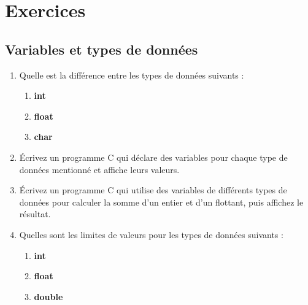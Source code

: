 \section{Exercices}

\subsection{Variables et types de données}
\begin{enumerate}
	\item Quelle est la différence entre les types de données suivants :
	\begin{enumerate}
		\item \textbf{int}
		\item \textbf{float}
		\item \textbf{char}
	\end{enumerate}
	
	\item Écrivez un programme C qui déclare des variables pour chaque type de données mentionné et affiche leurs valeurs.
		
			
			
	
	\item Écrivez un programme C qui utilise des variables de différents types de données pour calculer la somme d'un entier et d'un flottant, puis affichez le résultat.
		
			
			
			
	
	\item Quelles sont les limites de valeurs pour les types de données suivants :
	\begin{enumerate}
		\item \textbf{int}
		\item \textbf{float}
		\item \textbf{double}
	\end{enumerate}
\end{enumerate}

